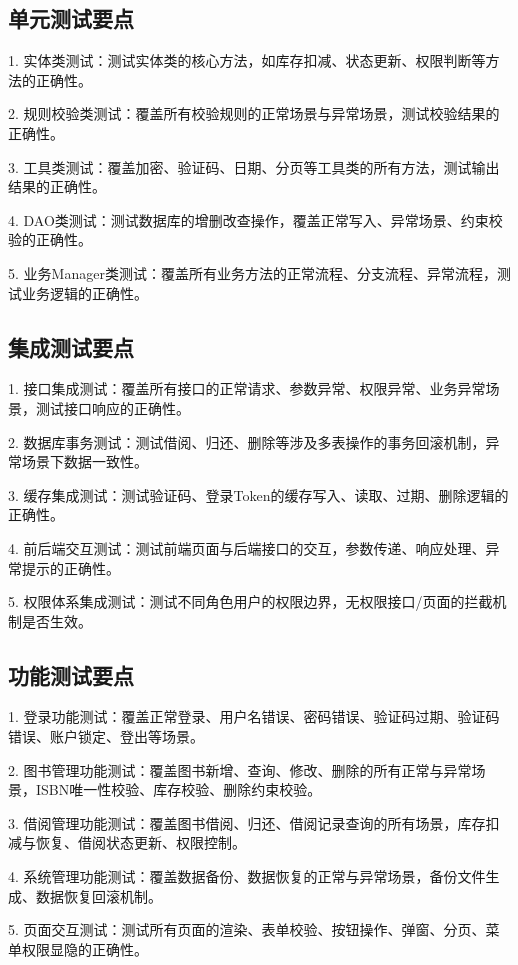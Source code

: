 \documentclass[12pt, a4paper]{article}
\begin{document}
\subsection{单元测试要点}

1. 实体类测试：测试实体类的核心方法，如库存扣减、状态更新、权限判断等方法的正确性。

2. 规则校验类测试：覆盖所有校验规则的正常场景与异常场景，测试校验结果的正确性。

3. 工具类测试：覆盖加密、验证码、日期、分页等工具类的所有方法，测试输出结果的正确性。

4. DAO类测试：测试数据库的增删改查操作，覆盖正常写入、异常场景、约束校验的正确性。

5. 业务Manager类测试：覆盖所有业务方法的正常流程、分支流程、异常流程，测试业务逻辑的正确性。

\subsection{集成测试要点}

1. 接口集成测试：覆盖所有接口的正常请求、参数异常、权限异常、业务异常场景，测试接口响应的正确性。

2. 数据库事务测试：测试借阅、归还、删除等涉及多表操作的事务回滚机制，异常场景下数据一致性。

3. 缓存集成测试：测试验证码、登录Token的缓存写入、读取、过期、删除逻辑的正确性。

4. 前后端交互测试：测试前端页面与后端接口的交互，参数传递、响应处理、异常提示的正确性。

5. 权限体系集成测试：测试不同角色用户的权限边界，无权限接口/页面的拦截机制是否生效。

\subsection{功能测试要点}

1. 登录功能测试：覆盖正常登录、用户名错误、密码错误、验证码过期、验证码错误、账户锁定、登出等场景。

2. 图书管理功能测试：覆盖图书新增、查询、修改、删除的所有正常与异常场景，ISBN唯一性校验、库存校验、删除约束校验。

3. 借阅管理功能测试：覆盖图书借阅、归还、借阅记录查询的所有场景，库存扣减与恢复、借阅状态更新、权限控制。

4. 系统管理功能测试：覆盖数据备份、数据恢复的正常与异常场景，备份文件生成、数据恢复回滚机制。

5. 页面交互测试：测试所有页面的渲染、表单校验、按钮操作、弹窗、分页、菜单权限显隐的正确性。
\end{document}

